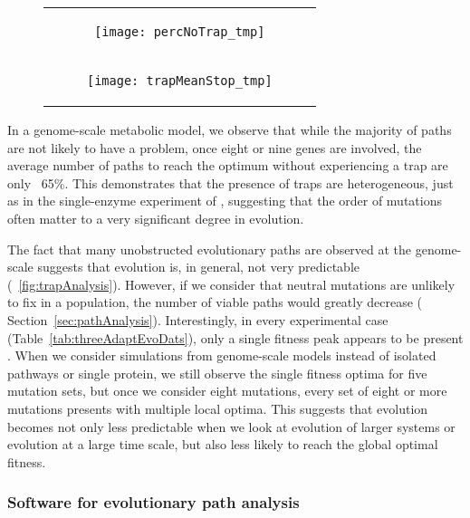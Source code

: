 \begin{figure}[H]
\newlength{\figwidth}
\setlength{\figwidth}{0.9\textwidth}
\centering
\begin{tabular}{c}
\begin{subfigure}[b]{\figwidth}
  \texttt{[image: percNoTrap\_tmp]}
  \caption{}
  \label{fig:trapAnalysis:percPath}
\end{subfigure}
\\
\begin{subfigure}[b]{\figwidth}
  \texttt{[image: trapMeanStop\_tmp]}
  \caption{} 
  \label{fig:trapAnalysis:meanStop}
\end{subfigure}
\\
\end{tabular}
\end{figure}


In a genome-scale metabolic model, we observe that while the majority
of paths are not likely to have a problem, once eight or nine genes are
involved, the average number of paths to reach the optimum without
experiencing a trap are only ~65\%. This demonstrates that the
presence of traps are heterogeneous, just as in the single-enzyme
experiment of \citet{Weinreich2006}, suggesting that the order of
mutations often matter to a very significant degree in evolution.

The fact that many unobstructed evolutionary paths are observed at the
genome-scale suggests that evolution is, in general, not very
predictable (\Fig~\ref{fig:trapAnalysis}). However, if we consider
that neutral mutations are unlikely to fix in a population, the number
of viable paths would greatly decrease (\suppOrApp
Section~\ref{sec:pathAnalysis}). Interestingly, in every experimental
case (Table~\ref{tab:threeAdaptEvoDats}), only a single fitness peak
appears to be present \citep{Lunzer2005,Weinreich2006}. When we
consider simulations from
genome-scale models instead of isolated pathways or single protein, we
still observe the single fitness optima for five mutation sets, but
once we consider eight mutations, every set of eight or more mutations
presents with multiple local optima. This suggests that evolution
becomes not only less predictable when we look at evolution of larger
systems or evolution at a large time scale, but also less likely to
reach the global optimal fitness.


\subsubsection{Software for evolutionary path analysis}

